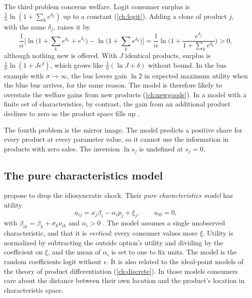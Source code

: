 The third problem concerns welfare. Logit consumer surplus is $\frac{1}{\alpha}\ln(1 + \sum_k e^{\delta_k})$ up to a
constant (\cref{ch:logit}). Adding a clone of product $j$, with the same $\delta_j$, raises it by
\begin{equation*}
  \frac{1}{\alpha}\Big[\ln\Big(1 + \sum_k e^{\delta_k} + e^{\delta_j}\Big) - \ln\Big(1 + \sum_k e^{\delta_k}\Big)\Big]
  = \frac{1}{\alpha}\ln\Big(1 + \frac{e^{\delta_j}}{1 + \sum_k e^{\delta_k}}\Big) > 0 ,
\end{equation*}
although nothing new is offered. With $J$ identical products, surplus is $\frac{1}{\alpha}\ln(1 + Je^{\delta})$, which
grows like $\frac{1}{\alpha}(\ln J + \delta)$ without bound. In the bus example with $\sigma \to \infty$, the bus lovers
gain $\ln 2$ in expected maximum utility when the blue bus arrives, for the same reason. The model is therefore likely to
overstate the welfare gains from new products (\cref{ch:newgoods}). In a model with a finite set of characteristics,
by contrast, the gain from an additional product declines to zero as the product space fills up
\citep[Section~2]{BerryPakes2007}.

The fourth problem is the mirror image. The model predicts a positive share for every product at every parameter value,
so it cannot use the information in products with zero sales. The inversion $\ln s_j$ is undefined at $s_j = 0$.

\subsection{The pure characteristics model}\label{sec:08-pcm}

\citet{BerryPakes2007} propose to drop the idiosyncratic shock. Their \emph{pure characteristics model} has utility
\begin{equation}\label{eq:08-pcm}
  u_{ij} = x_j\beta_i - \alpha_i p_j + \xi_j, \qquad u_{i0} = 0,
\end{equation}
with $\beta_{ik} = \beta_k + \sigma_k\nu_{ik}$ and $\alpha_i > 0$ \citep[eqs.~10--11]{BerryPakes2007}. The model
assumes a single unobserved characteristic, and that it is \emph{vertical}: every consumer values more $\xi$. Utility is
normalized by subtracting the outside option's utility and dividing by the coefficient on $\xi$, and the mean of
$\alpha_i$ is set to one to fix units. The model is the random coefficients logit without $\epsilon$. It is also
related to the ideal-point models of the theory of product differentiation (\cref{ch:discrete}). In those models
consumers care about the distance between their own location and the product's location in characteristic space.

